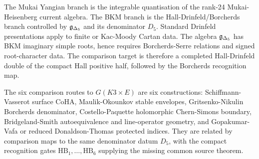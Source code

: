 \begin{remark}
\label{spk3e:two-branches}
The Mukai Yangian branch is the integrable quantisation of the rank-24
Mukai-Heisenberg current algebra. The BKM branch is the
Hall-Drinfeld/Borcherds branch controlled by
\(\mathfrak{g}_{\Delta_5}\) and its denominator \(D_5\). Standard Drinfeld
presentations apply to finite or Kac-Moody Cartan data. The algebra
\(\mathfrak{g}_{\Delta_5}\) has BKM imaginary simple roots, hence requires
Borcherds-Serre relations and signed root-character data. The comparison
target is therefore a completed
Hall-Drinfeld double of the compact Hall positive half, followed by the
Borcherds recognition map.
\end{remark}

\begin{remark}
\label{spk3e:six-constructions}
The six comparison routes to \(G(K3\times E)\) are six constructions:
Schiffmann-Vasserot surface CoHA, Maulik-Okounkov stable envelopes,
Gritsenko-Nikulin Borcherds denominator, Costello-Paquette holomorphic
Chern-Simons boundary, Bridgeland-Smith autoequivalence and line-operator
geometry, and Gopakumar-Vafa or reduced Donaldson-Thomas protected
indices. They are related by comparison maps to the same denominator
datum \(D_5\), with the compact recognition gates
\(\mathrm{HB}_1,\ldots,\mathrm{HB}_6\) supplying the missing common
source theorem.
\end{remark}
